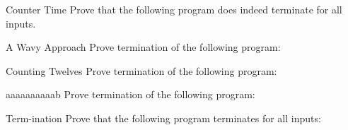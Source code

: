 \documentclass[
  english
]{tumteaching}
\begin{document}
\clearpage
\begin{assignment}[L]{Counter Time}
	Prove that the following program does indeed terminate for all inputs.
	\begin{center}
		\begin{tikzpicture}
			
		\end{tikzpicture}
	\end{center}

	\clearpage
\end{assignment}

\clearpage
\begin{assignment}[L]{A Wavy Approach}
	Prove termination of the following program:
	\begin{center}
		\begin{tikzpicture}
			
		\end{tikzpicture}
	\end{center}

\end{assignment}

\clearpage
\begin{assignment}[H,points=6]{Counting Twelves}
	Prove termination of the following program:
	\begin{center}
		\begin{tikzpicture}
			
		\end{tikzpicture}
	\end{center}

\end{assignment}

\clearpage
\begin{assignment}[H,points=4]{aaaaaaaaaab}
	Prove termination of the following program:
	\begin{center}
		\begin{tikzpicture}
			
		\end{tikzpicture}
	\end{center}

\end{assignment}

\clearpage
\begin{assignment}[H,points=10]{Term-ination}
	Prove that the following program terminates for all inputs:
	\begin{center}
		\begin{tikzpicture}
			
		\end{tikzpicture}
	\end{center}

	\noindent{}
	
	\noindent{}

\end{assignment}
\end{document}
